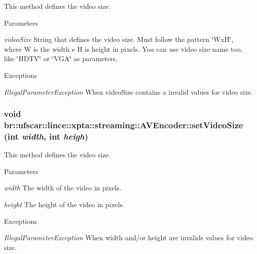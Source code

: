 This method defines the video size. 


\begin{DoxyParams}{Parameters}
\item[{\em videoSize}]String that defines the video size. Must follow the pattern \char`\"{}WxH\char`\"{}, where W is the width e H is height in pixels. You can use video size name too, like \char`\"{}HDTV\char`\"{} or \char`\"{}VGA\char`\"{} as parameters. \end{DoxyParams}

\begin{DoxyExceptions}{Exceptions}
\item[{\em IllegalParameterException}]When videoSize contains a invalid values for video size. \end{DoxyExceptions}
\hypertarget{classbr_1_1ufscar_1_1lince_1_1xpta_1_1streaming_1_1AVEncoder_ae99cf71b93bc17447fdc85df534e58d7}{
\subsubsection[{setVideoSize}]{\setlength{\rightskip}{0pt plus 5cm}void br::ufscar::lince::xpta::streaming::AVEncoder::setVideoSize (int {\em width}, \/  int {\em heigh})}}
\label{classbr_1_1ufscar_1_1lince_1_1xpta_1_1streaming_1_1AVEncoder_ae99cf71b93bc17447fdc85df534e58d7}


This method defines the video size. 


\begin{DoxyParams}{Parameters}
\item[{\em width}]The width of the video in pixels. \item[{\em height}]The height of the video in pixels. \end{DoxyParams}

\begin{DoxyExceptions}{Exceptions}
\item[{\em IllegalParameterException}]When width and/or height are invalids values for video size. \end{DoxyExceptions}


